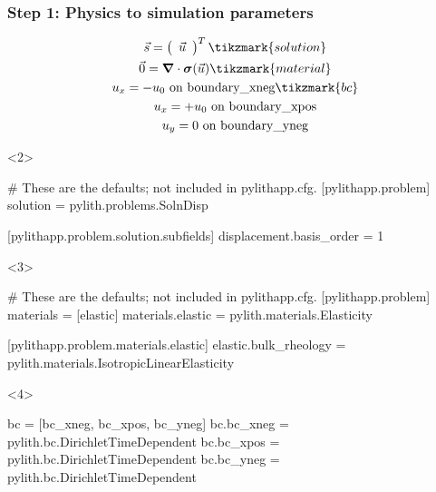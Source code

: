 \documentclass[aspectratio=169]{beamer}
\begin{document}
\begin{frame}[t,fragile]
  \frametitle{Step 1: Physics to simulation parameters}
  \summary{}

  \begin{minipage}[t]{0.35\textwidth}
    {\scriptsize
    \begin{gather*}
      \vec{s} = \left(\begin{array}{c} \vec{u} \end{array}\right)^T \tikzmark{solution}\\
      \vec{0} = \boldsymbol{\nabla} \cdot \boldsymbol{\sigma}(\vec{u}) \tikzmark{material}\\
      u_x = -u_0 \text{ on boundary\_xneg} \tikzmark{bc}\\
      u_x = +u_0 \text{ on boundary\_xpos} \\
      u_y = 0 \text{ on boundary\_yneg}
    \end{gather*}}
  \end{minipage}
  \hfill
  \begin{minipage}[t]{0.60\textwidth}
    \begin{onlyenv}<2>
      \begin{cfgcode}
        # These are the defaults; not included in pylithapp.cfg.
        [pylithapp.problem]
        solution = pylith.problems.SolnDisp
        
        [pylithapp.problem.solution.subfields]
        displacement.basis_order = 1
      \end{cfgcode}
    \end{onlyenv}
    \begin{onlyenv}<3>
      \begin{cfgcode}
        # These are the defaults; not included in pylithapp.cfg.
        [pylithapp.problem]
        materials = [elastic]
        materials.elastic = pylith.materials.Elasticity

        [pylithapp.problem.materials.elastic]
        elastic.bulk_rheology = pylith.materials.IsotropicLinearElasticity
      \end{cfgcode}
    \end{onlyenv}
    \begin{onlyenv}<4>
      \begin{cfgcode}
        bc = [bc_xneg, bc_xpos, bc_yneg]
        bc.bc_xneg = pylith.bc.DirichletTimeDependent
        bc.bc_xpos = pylith.bc.DirichletTimeDependent
        bc.bc_yneg = pylith.bc.DirichletTimeDependent
        

\end{cfgcode}
\end{onlyenv}
\end{minipage}
\end{frame}
\end{document}

